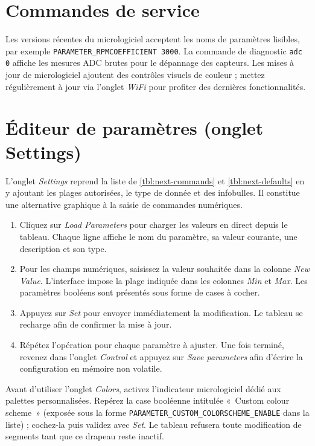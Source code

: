 \section{Commandes de service}
Les versions récentes du micrologiciel acceptent les noms de paramètres lisibles, par exemple \verb|PARAMETER_RPMCOEFFICIENT 3000|.
La commande de diagnostic \verb|adc 0| affiche les mesures ADC brutes pour le dépannage des capteurs.
Les mises à jour de micrologiciel ajoutent des contrôles visuels de couleur ; mettez régulièrement à jour via l'onglet \emph{WiFi} pour profiter des dernières fonctionnalités.

\section{Éditeur de paramètres (onglet Settings)}
L'onglet \emph{Settings} reprend la liste de \autoref{tbl:next-commands} et \autoref{tbl:next-defaults} en y ajoutant les plages autorisées, le type de donnée et des infobulles.
Il constitue une alternative graphique à la saisie de commandes numériques.

\begin{enumerate}
    \item Cliquez sur \emph{Load Parameters} pour charger les valeurs en direct depuis le tableau. Chaque ligne affiche le nom du paramètre, sa valeur courante, une description et son type.
    \item Pour les champs numériques, saisissez la valeur souhaitée dans la colonne \emph{New Value}. L'interface impose la plage indiquée dans les colonnes \emph{Min} et \emph{Max}. Les paramètres booléens sont présentés sous forme de cases à cocher.
    \item Appuyez sur \emph{Set} pour envoyer immédiatement la modification. Le tableau se recharge afin de confirmer la mise à jour.
    \item Répétez l'opération pour chaque paramètre à ajuster. Une fois terminé, revenez dans l'onglet \emph{Control} et appuyez sur \emph{Save parameters} afin d'écrire la configuration en mémoire non volatile.
\end{enumerate}

Avant d'utiliser l'onglet \emph{Colors}, activez l'indicateur micrologiciel dédié aux palettes personnalisées.
Repérez la case booléenne intitulée «~Custom colour scheme~» (exposée sous la forme \verb|PARAMETER_CUSTOM_COLORSCHEME_ENABLE| dans la liste) ; cochez-la puis validez avec \emph{Set}. Le tableau refusera toute modification de segments tant que ce drapeau reste inactif.

